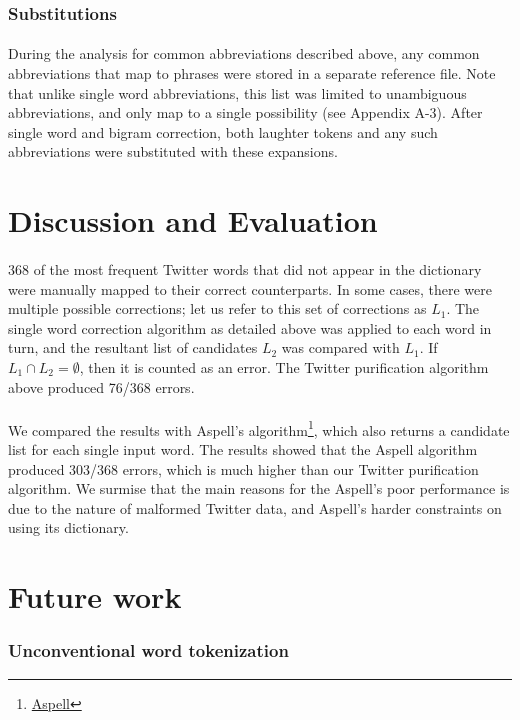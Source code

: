 \documentclass[twocolumn,10pt]{article}
\begin{document}
\subsubsection*{Substitutions}
\paragraph{} During the analysis for common abbreviations described above, any common abbreviations that map to phrases were stored in a separate reference file. Note that unlike single word abbreviations, this list was limited to unambiguous abbreviations, and only map to a single possibility (see Appendix A-3). After single word and bigram correction, both laughter tokens and any such abbreviations were substituted with these expansions.
\section*{Discussion and Evaluation}
\paragraph{} 368 of the most frequent Twitter words that did not appear in the dictionary were manually mapped to their correct counterparts. In some cases, there were multiple possible corrections; let us refer to this set of corrections as $L_1$. The single word correction algorithm as detailed above was applied to each word in turn, and the resultant list of candidates $L_2$ was compared with $L_1$. If $L_1\cap L_2 = \emptyset$, then it is counted as an error. The Twitter purification algorithm above produced 76/368 errors.
\paragraph{}We compared the results with Aspell's algorithm\footnote{\href{http://aspell.net/}{Aspell}}, which also returns a candidate list for each single input word. The results showed that the Aspell algorithm produced 303/368 errors, which is much higher than our Twitter purification algorithm. We surmise that the main reasons for the Aspell's poor performance is due to the nature of malformed Twitter data, and Aspell's harder constraints on using its dictionary.
\section*{Future work}
\subsubsection*{Unconventional word tokenization}
\end{document}
